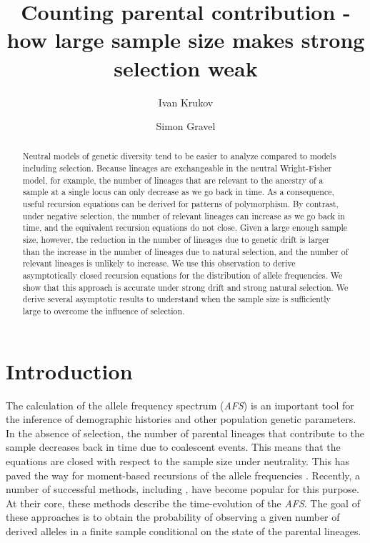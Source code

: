 \documentclass[review]{elsarticle}
\begin{document}
\begin{frontmatter}
  \title{Counting parental contribution - how large sample size makes strong selection weak}

  \author{Ivan Krukov}
  \author{Simon Gravel}

  \begin{abstract}
    Neutral models of genetic diversity tend to be easier to analyze compared to models including
    selection. Because lineages are exchangeable in the neutral Wright-Fisher model, for example,
    the number of lineages that are relevant to the ancestry of a sample at a single locus can only
    decrease as we go back in time. As a consequence, useful recursion equations can be derived for
    patterns of polymorphism. By contrast, under negative selection, the number of relevant lineages
    can increase as we go back in time, and the equivalent recursion equations do not close. Given a
    large enough sample size, however, the reduction in the number of lineages due to genetic drift
    is larger than the increase in the number of lineages due to natural selection, and the number
    of relevant lineages is unlikely to increase. We use this observation to derive asymptotically
    closed recursion equations for the distribution of allele frequencies. We show that this
    approach is accurate under strong drift and strong natural selection. We derive several
    asymptotic results to understand when the sample size is sufficiently large to overcome the
    influence of selection.
    
  \end{abstract}
\end{frontmatter}

\section{Introduction}
\label{sec:introduciton}

The calculation of the allele frequency spectrum (\textit{AFS}) is an important tool for the inference
of demographic histories and other population genetic parameters. In the absence of selection, the
number of parental lineages that contribute to the sample decreases back in time due to coalescent
events. This means that the equations are closed with respect to the sample size under neutrality.
This has paved the way for moment-based recursions of the allele frequencies
\citep{KimuraCrow1964,Ewens1972,DonnellyKurtz1999}. Recently, a number of successful methods,
including \citep{GutenkunstEtAl2009,JouganousEtAl2017,KammEtAl2017}, have become popular for this
purpose. At their core, these methods describe the time-evolution of the \textit{AFS}. The goal of
these approaches is to obtain the probability of observing a given number of derived alleles in a
finite sample conditional on the state of the parental lineages.
\end{document}
